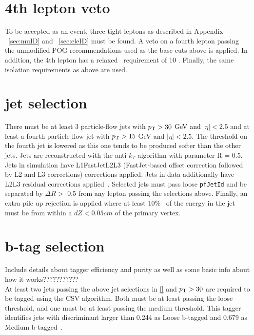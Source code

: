 \section{4th lepton veto}
\label{sec:4thLeptonVeto}
To be accepted as an event, three tight leptons as described in Appendix ~\ref{sec:muID} and ~\ref{sec:eleID} must be found. A veto on a fourth lepton passing the unmodified POG recommendations used as the base cuts above is applied. In addition, the 4th lepton has a relaxed \pt \ requirement of 10 \GeV. Finally, the same isolation requirements as above are used.

\section{jet selection}
\label{sec:JetSelection}
There must be at least 3 particle-flow jets with $p_{\mathrm{T}} > 30$ GeV and $|\eta| < 2.5$ and at least a fourth particle-flow jet with $p_{\mathrm{T}} > 15$ GeV and $|\eta| < 2.5$. The threshold on the fourth jet is lowered as this one tends to be produced softer than the other jets.
Jets are reconstructed with the anti-$k_{T}$ algorithm with parameter R = 0.5.  
Jets in simulation have L1FastJetL2L3 (FastJet-based offset correction followed by L2 and L3 corrections) corrections applied.  
Jets in data additionally have L2L3 residual corrections applied~\cite{jetcorrectionstwiki}. 
Selected jets must pass loose {\tt pfJetId} and be separated by $\Delta R >$ 0.5 from any lepton passing the selections above. Finally, an extra pile up rejection is applied where at least 10\% \ of the energy in the jet must be from within a $dZ < 0.05 cm$ of the primary vertex.

\section{b-tag selection}
\label{sec:bTagSelection}

Include details about tagger efficiency and purity as well as some basic info about how it works???????????\\

At least two jets passing the above jet selections in \ref{} and $p_{\mathrm{T}} > 30$ are required to be tagged using the CSV algorithm. Both must be at least passing the loose threshold, and one must be at least passing the medium threshold.
This tagger identifies jets with discriminant larger than  0.244 as Loose b-tagged and 0.679 as Medium b-tagged~\cite{btagICHEP2012twiki}.




